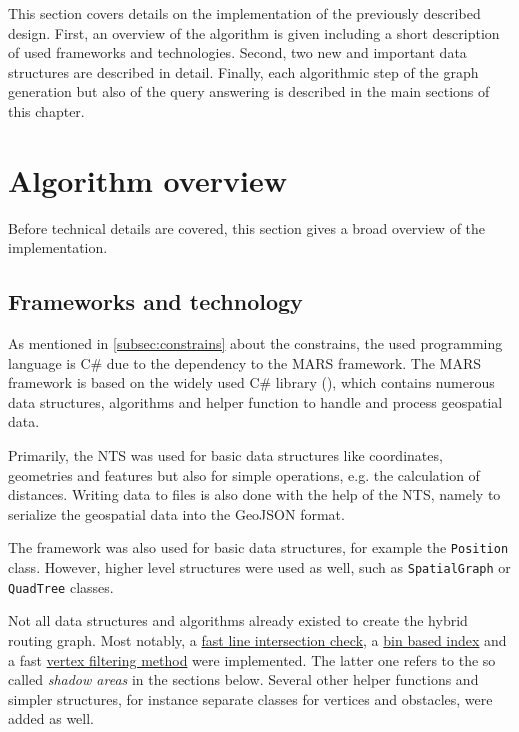 
This section covers details on the implementation of the previously described design.
First, an overview of the algorithm is given including a short description of used frameworks and technologies.
Second, two new and important data structures are described in detail.
Finally, each algorithmic step of the graph generation but also of the query answering is described in the main sections of this chapter.

\section{Algorithm overview}

	Before technical details are covered, this section gives a broad overview of the implementation.

	\subsection{Frameworks and technology}
	
		As mentioned in \cref{subsec:constrains} about the constrains, the used programming language is C\# due to the dependency to the MARS framework.
		The MARS framework is based on the widely used C\# library  (), which contains numerous data structures, algorithms and helper function to handle and process geospatial data.
		
		Primarily, the NTS was used for basic data structures like coordinates, geometries and features but also for simple operations, e.g. the calculation of distances.
		Writing data to files is also done with the help of the NTS, namely to serialize the geospatial data into the GeoJSON format.
		
		The  framework was also used for basic data structures, for example the \texttt{Position} class.
		However, higher level structures were used as well, such as \texttt{SpatialGraph} or \texttt{QuadTree} classes.
		
		Not all data structures and algorithms already existed to create the hybrid routing graph.
		Most notably, a \hyperref[subsubsec:intersection-checks]{fast line intersection check}, a \hyperref[subsec:binindex]{bin based index} and a fast \hyperref[subsec:shadow-areas]{vertex filtering method} were implemented.
		The latter one refers to the so called \emph{shadow areas} in the sections below.
		Several other helper functions and simpler structures, for instance separate classes for vertices and obstacles, were added as well.

